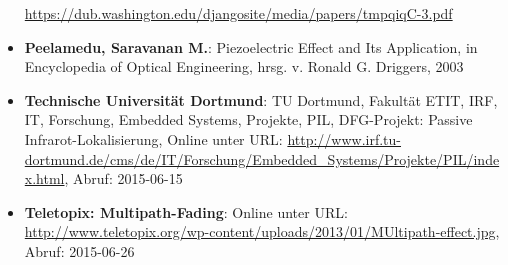 \begin{itemize}[leftmargin=*]
\url{https://dub.washington.edu/djangosite/media/papers/tmpqiqC-3.pdf}
\item[] \textbf{Peelamedu, Saravanan M.}: Piezoelectric Effect and Its Application, in Encyclopedia of Optical Engineering, hrsg. v. Ronald G. Driggers, 2003
\item[] \textbf{Technische Universität Dortmund}: TU Dortmund, Fakultät ETIT, IRF, IT, Forschung, Embedded Systems,  Projekte, PIL, DFG-Projekt: Passive Infrarot-Lokalisierung, Online unter URL: \url{http://www.irf.tu-dortmund.de/cms/de/IT/Forschung/Embedded_Systems/Projekte/PIL/index.html}, Abruf: 2015-06-15
\item[] \textbf{Teletopix: Multipath-Fading}: Online unter URL: \url{http://www.teletopix.org/wp-content/uploads/2013/01/MUltipath-effect.jpg}, Abruf: 2015-06-26
\end{itemize}
